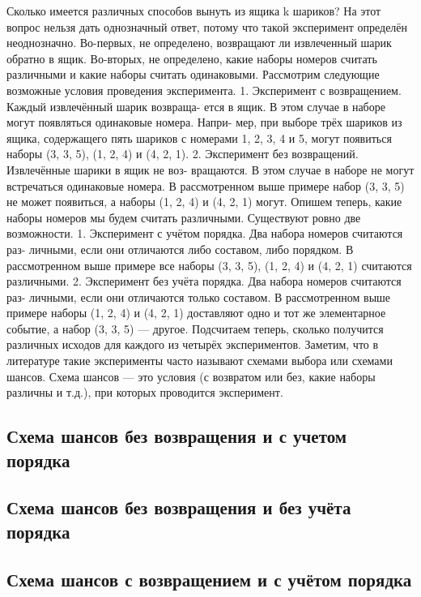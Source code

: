 Сколько имеется различных способов вынуть из ящика k шариков? На
этот вопрос нельзя дать однозначный ответ, потому что такой эксперимент
определён неоднозначно.
Во-первых, не определено, возвращают ли извлеченный шарик обратно в
ящик. Во-вторых, не определено, какие наборы номеров считать различными
и какие наборы считать одинаковыми.
Рассмотрим следующие возможные условия проведения эксперимента.
1. Эксперимент с возвращением. Каждый извлечённый шарик возвраща-
ется в ящик.
В этом случае в наборе могут появляться одинаковые номера. Напри-
мер, при выборе трёх шариков из ящика, содержащего пять шариков
с номерами 1, 2, 3, 4 и 5, могут появиться наборы (3, 3, 5), (1, 2, 4)
и (4, 2, 1).
2. Эксперимент без возвращений. Извлечённые шарики в ящик не воз-
вращаются.
В этом случае в наборе не могут встречаться одинаковые номера. В
рассмотренном выше примере набор (3, 3, 5) не может появиться, а
наборы (1, 2, 4) и (4, 2, 1) могут.
Опишем теперь, какие наборы номеров мы будем считать различными.
Существуют ровно две возможности.
1. Эксперимент с учётом порядка. Два набора номеров считаются раз-
личными, если они отличаются либо составом, либо порядком.
В рассмотренном выше примере все наборы (3, 3, 5), (1, 2, 4) и (4, 2, 1)
считаются различными.
2. Эксперимент без учёта порядка. Два набора номеров считаются раз-
личными, если они отличаются только составом.
В рассмотренном выше примере наборы (1, 2, 4) и (4, 2, 1) доставляют
одно и тот же элементарное событие, а набор (3, 3, 5) — другое.
Подсчитаем теперь, сколько получится различных исходов для каждого
из четырёх экспериментов. Заметим, что в литературе такие эксперименты
часто называют схемами выбора или схемами шансов. Схема шансов — это
условия (с возвратом или без, какие наборы различны и т.д.), при которых
проводится эксперимент.

\subsection{Схема шансов без возвращения и с учетом порядка}


\subsection{Схема шансов без возвращения и без учёта порядка}

\subsection{Схема шансов с возвращением и с учётом порядка}

